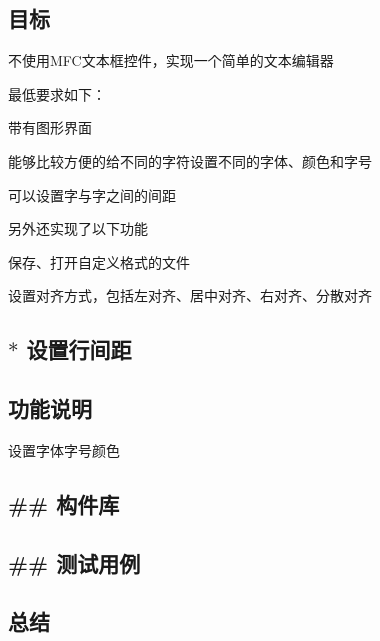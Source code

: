 \subsection*{目标}


\begin{DoxyEnumerate}
\item 不使用\+M\+F\+C文本框控件，实现一个简单的文本编辑器
\item 最低要求如下：
\begin{DoxyItemize}
\item 带有图形界面
\item 能够比较方便的给不同的字符设置不同的字体、颜色和字号
\item 可以设置字与字之间的间距
\end{DoxyItemize}
\item 另外还实现了以下功能
\begin{DoxyItemize}
\item 保存、打开自定义格式的文件
\item 设置对齐方式，包括左对齐、居中对齐、右对齐、分散对齐 \subsection*{$\ast$ 设置行间距 }
\end{DoxyItemize}

\subsection*{功能说明}
\end{DoxyEnumerate}
\begin{DoxyEnumerate}
\item 设置字体字号颜色 \subsection*{}
\end{DoxyEnumerate}

\subsection*{\#\# 构件库 }

\subsection*{\#\# 测试用例 }

\subsection*{总结}